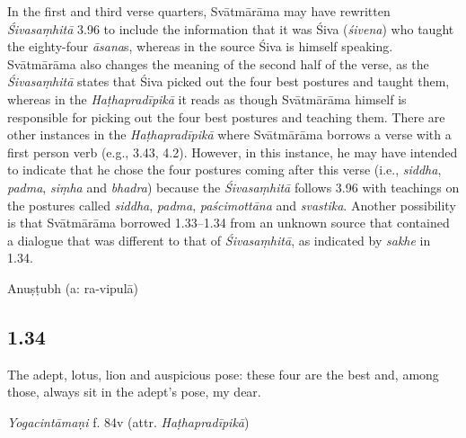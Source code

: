 \begin{ekdosis}
\begin{philcomm}[hp01_033]
 
In the first and third verse quarters, Svātmārāma may have rewritten \emph{Śivasaṃhitā} 3.96 to include the information that it was Śiva (\emph{śivena}) who taught the eighty-four \emph{āsana}s, whereas in the source Śiva is himself speaking. Svātmārāma also changes the meaning of the second half of the verse, as the \emph{Śivasaṃhitā} states that Śiva picked out the four best postures and taught them, whereas in the \emph{Haṭhapradīpikā} it reads as though Svātmārāma himself is responsible for picking out the four best postures and teaching them. There are other instances in the \emph{Haṭhapradīpikā} where Svātmārāma borrows a verse with a first person verb (e.g., 3.43, 4.2). However, in this instance, he may have intended to indicate that he chose the four postures coming after this verse (i.e., \emph{siddha}, \emph{padma}, \emph{siṃha} and \emph{bhadra}) because the \emph{Śivasaṃhitā} follows 3.96 with teachings on the postures called \emph{siddha}, \emph{padma}, \emph{paścimottāna} and \emph{svastika}. Another possibility is that Svātmārāma borrowed 1.33–1.34 from an unknown source that contained a dialogue that was different to that of \emph{Śivasaṃhitā}, as indicated by \emph{sakhe} in 1.34.
\end{philcomm}

\begin{metre}[hp01_033]
Anuṣṭubh (a: ra-vipulā)
\end{metre}

\subsection*{1.34}
\begin{translation}[hp01_034]
The adept, lotus, lion and auspicious pose: these four are the best and, among those, always sit in the adept’s pose, my dear.
\end{translation}


\begin{testimonia}[hp01_034]
\emph{Yogacintāmaṇi} f. 84v (attr. \emph{Haṭhapradīpikā})

\begin{versinnote}
\end{versinnote}


\end{testimonia}
\end{ekdosis}
